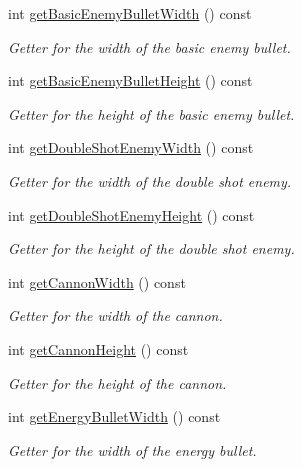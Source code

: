 \begin{DoxyCompactItemize}
int \hyperlink{classGameLogic_1_1Level_a3986fbece7460c76852b0455b433b06d}{get\+Basic\+Enemy\+Bullet\+Width} () const
\begin{DoxyCompactList}\small\item\em Getter for the width of the basic enemy bullet. \end{DoxyCompactList}\item 
int \hyperlink{classGameLogic_1_1Level_a5063897104bbf7ff1f2d173cc37a0f57}{get\+Basic\+Enemy\+Bullet\+Height} () const
\begin{DoxyCompactList}\small\item\em Getter for the height of the basic enemy bullet. \end{DoxyCompactList}\item 
int \hyperlink{classGameLogic_1_1Level_a20cbcb471e2060a0024c5f7a055a85ce}{get\+Double\+Shot\+Enemy\+Width} () const
\begin{DoxyCompactList}\small\item\em Getter for the width of the double shot enemy. \end{DoxyCompactList}\item 
int \hyperlink{classGameLogic_1_1Level_a3196aa721c3d7b09be321ef3bbf0c5e9}{get\+Double\+Shot\+Enemy\+Height} () const
\begin{DoxyCompactList}\small\item\em Getter for the height of the double shot enemy. \end{DoxyCompactList}\item 
int \hyperlink{classGameLogic_1_1Level_a423e12a9f87441175f1ae449096ee997}{get\+Cannon\+Width} () const
\begin{DoxyCompactList}\small\item\em Getter for the width of the cannon. \end{DoxyCompactList}\item 
int \hyperlink{classGameLogic_1_1Level_ae66002e5cfd3f4404d34e1221505aeef}{get\+Cannon\+Height} () const
\begin{DoxyCompactList}\small\item\em Getter for the height of the cannon. \end{DoxyCompactList}\item 
int \hyperlink{classGameLogic_1_1Level_aba38362ae3b9b72fdb883dcf42965f78}{get\+Energy\+Bullet\+Width} () const
\begin{DoxyCompactList}\small\item\em Getter for the width of the energy bullet. \end{DoxyCompactList}\item 

\end{DoxyCompactItemize}
